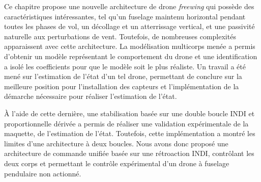 Ce chapitre propose une nouvelle architecture de drone \textit{freewing} qui possède des caractéristiques intéressantes, tel qu'un fuselage maintenu horizontal pendant toutes les phases de vol, un décollage et un atterrissage vertical, et une passivité naturelle aux perturbations de vent. Toutefois, de nombreuses complexités apparaissent avec cette architecture. La modélisation multicorps menée a permis d'obtenir un modèle représentant le comportement du drone et une identification a isolé les coefficients pour que le modèle soit le plus réaliste. Un travail a été mené sur l'estimation de l'état d'un tel drone, permettant de conclure sur la meilleure position pour l'installation des capteurs et l'implémentation de la démarche nécessaire pour réaliser l'estimation de l'état. 

À l'aide de cette dernière, une stabilisation basée sur une double boucle INDI et proportionnelle dérivée a permis de réaliser une validation expérimentale de la maquette, de l'estimation de l'état. Toutefois, cette implémentation a montré les limites d'une architecture à deux boucles. Nous avons donc proposé une architecture de commande unifiée basée sur une rétroaction INDI, contrôlant les deux corps et permettant le contrôle expérimental d'un drone à fuselage pendulaire non actionné.







